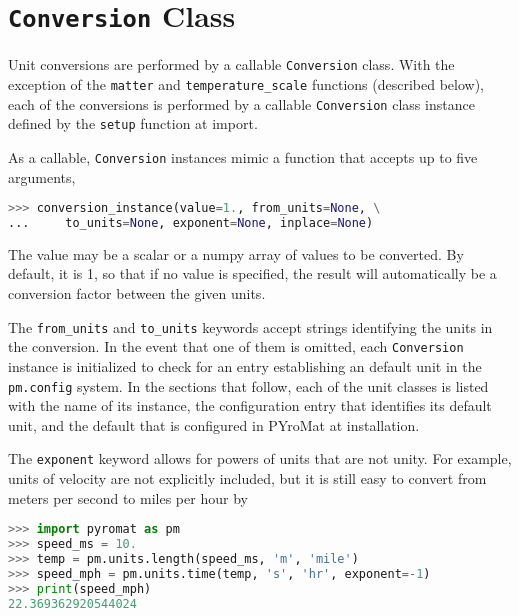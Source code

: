 \section{\texttt{Conversion} Class}

Unit conversions are performed by a callable \verb|Conversion| class.  With the exception of the \verb|matter| and \verb|temperature_scale| functions (described below), each of the conversions is performed by a callable \verb|Conversion| class instance defined by the \verb|setup| function at import.

As a callable, \verb|Conversion| instances mimic a function that accepts up to five arguments,
\begin{lstlisting}[language=Python]
>>> conversion_instance(value=1., from_units=None, \
...     to_units=None, exponent=None, inplace=None)
\end{lstlisting}

The value may be a scalar or a numpy array of values to be converted.  By default, it is 1, so that if no value is specified, the result will automatically be a conversion factor between the given units.

The \verb|from_units| and \verb|to_units| keywords accept strings identifying the units in the conversion.  In the event that one of them is omitted, each \verb|Conversion| instance is initialized to check for an entry establishing an default unit in the \verb|pm.config| system.  In the sections that follow, each of the unit classes is listed with the name of its instance, the configuration entry that identifies its default unit, and the default that is configured in PYroMat at installation.

The \verb|exponent| keyword allows for powers of units that are not unity.  For example, units of velocity are not explicitly included, but it is still easy to convert from meters per second to miles per hour by
\begin{lstlisting}[language=Python]
>>> import pyromat as pm
>>> speed_ms = 10.
>>> temp = pm.units.length(speed_ms, 'm', 'mile')
>>> speed_mph = pm.units.time(temp, 's', 'hr', exponent=-1)
>>> print(speed_mph)
22.369362920544024
\end{lstlisting}


